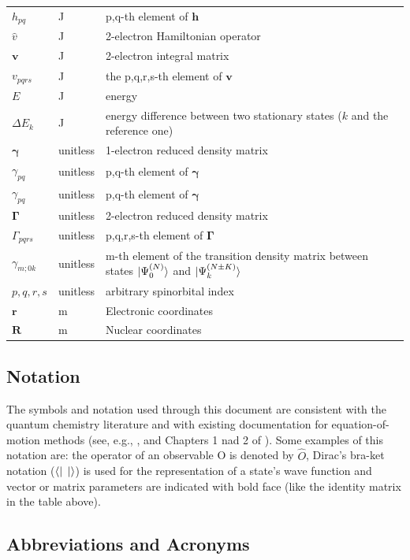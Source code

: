 \documentclass[12pt]{article}
\begin{document}
\begin{longtable*}{l l p{12cm}}
$h_{pq}$ & \si{\joule} & p,q-th element of $\mathbf{h}$\\
$\hat{v}$ & \si{\joule} & 2-electron Hamiltonian operator\\
$\mathbf{v}$ & \si{\joule} & 2-electron integral matrix\\
$v_{pqrs}$ & \si{\joule} & the p,q,r,s-th element of $\mathbf{v}$\\
$E$ & \si{\joule} & energy\\
$\Delta E_{k}$ & \si{\joule} & energy difference between two stationary 
states ($k$ and the reference one)\\
$\boldsymbol{\gamma}$ & unitless& 1-electron reduced density matrix\\
$\gamma_{pq}$ & unitless& p,q-th element of $\boldsymbol{\gamma}$\\
$\gamma_{pq}$ & unitless& p,q-th element of $\boldsymbol{\gamma}$\\
$\boldsymbol{\Gamma}$ & unitless& 2-electron reduced density matrix\\
$\Gamma_{pqrs}$ & unitless& p,q,r,s-th element of $\boldsymbol{\Gamma}$\\
$\gamma_{m;0k}$ & unitless& m-th element of the transition density matrix 
between states $\ket{\Psi^{(N)}_0}$ and $\ket{\Psi^{(N \pm K)}_{k}}$\\
$p,q,r,s$ & unitless & arbitrary spinorbital index\\
$\mathbf{r}$ & \si{\metre} & Electronic coordinates\\
$\mathbf{R}$ & \si{\metre} & Nuclear coordinates\\
\bottomrule
\end{longtable*}
\subsection{Notation}
The symbols and notation used through this document are consistent with the 
quantum chemistry literature and with existing documentation for 
equation-of-motion methods (see, e.g., \cite{Pernal2018}, \cite{McKoy1977} and 
Chapters 1 nad 2 of \cite{szabo-ostlund}). Some examples of this notation are: 
the operator of an observable O is denoted by $\hat{O}$, Dirac's bra-ket 
notation ($\bra{}$ $\ket{}$) is used for the representation of a state's wave 
function and vector or matrix parameters are indicated with bold face (like the 
identity matrix in the table above).


\subsection{Abbreviations and Acronyms}
\end{document}
